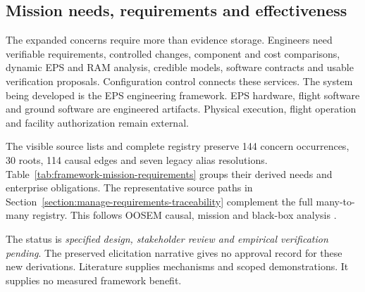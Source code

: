 \subsection{Mission needs, requirements and effectiveness}
\label{subsection:framework-mission-needs}
\label{subsection:framework-moes}

The expanded concerns require more than evidence storage. Engineers need verifiable requirements, controlled changes, component and cost comparisons, dynamic EPS and RAM analysis, credible models, software contracts and usable verification proposals. Configuration control connects these services. The system being developed is the EPS engineering framework. EPS hardware, flight software and ground software are engineered artifacts. Physical execution, flight operation and facility authorization remain external.

The visible source lists and complete registry preserve 144 concern occurrences, 30 roots, 114 causal edges and seven legacy alias resolutions. Table~\ref{tab:framework-mission-requirements} groups their derived needs and enterprise obligations. The representative source paths in Section~\ref{section:manage-requirements-traceability} complement the full many-to-many registry. This follows OOSEM causal, mission and black-box analysis \citep[Secs.~17.3.2--17.3.3]{friedenthal2014practical}.

The status is \textit{specified design, stakeholder review and empirical verification pending}. The preserved elicitation narrative gives no approval record for these new derivations. Literature supplies mechanisms and scoped demonstrations. It supplies no measured framework benefit.

